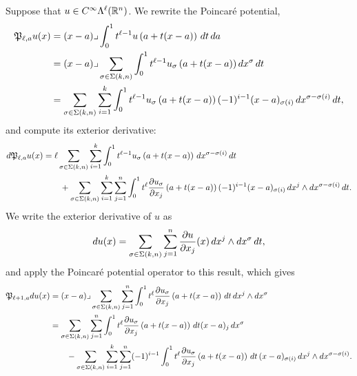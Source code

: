 \documentclass[10pt,letterpaper]{article}
\begin{document}
Suppose that $u \in C^{\infty}\Lambda^{\ell}({\mathbb R}^n)$.
We rewrite the Poincar\'e potential,
\begin{align*}
    {\mathfrak P}_{\ell,a} u(x) 
    &= 
    (x-a)\lrcorner \int_{0}^{1} t^{\ell-1} u\left(a+t(x-a)\right)\,dt\,da\;
    \\&
    = 
    (x-a)\lrcorner 
    \sum_{\sigma \in \Sigma(k,n)}
    \int_{0}^{1} 
    t^{\ell-1} u_{\sigma}\left(a+t(x-a)\right) dx^{\sigma} \,dt 
    \\&
    = 
    \sum_{\sigma \in \Sigma(k,n)} \sum_{i=1}^{k}
    \int_{0}^{1} 
    t^{\ell-1} u_{\sigma}\left(a+t(x-a)\right) (-1)^{i-1} (x-a)_{\sigma(i) } \,dx^{\sigma-\sigma(i)} \,dt 
    ,
\end{align*}
and compute its exterior derivative:
\begin{align*}
    d {\mathfrak P}_{\ell,a} u(x) 
    &= 
    \ell
    \sum_{\sigma \in \Sigma(k,n)} \sum_{i=1}^{k}
    \int_{0}^{1} 
    t^{\ell-1} u_{\sigma}\left(a+t(x-a)\right) \,dx^{\sigma-\sigma(i)} \,dt 
    \\&\qquad
    + 
    \sum_{\sigma \in \Sigma(k,n)} \sum_{i=1}^{k} \sum_{j=1}^{n}
    \int_{0}^{1} 
    t^{\ell} \frac{ \partial u_{\sigma} }{\partial x_{j}}\left(a+t(x-a)\right) (-1)^{i-1} (x-a)_{\sigma(i) } \,dx^{j} \wedge dx^{\sigma-\sigma(i)} \,dt 
    .
\end{align*}
We write the exterior derivative of $u$ as 
\begin{align*}
    d u(x)
    =
    \sum_{\sigma \in \Sigma(k,n)} \sum_{j=1}^{n}
    \frac{ \partial u }{\partial x_{j}}(x) \,dx^{j} \wedge dx^{\sigma} \,dt 
    ,
\end{align*}
and apply the Poincar\'e potential operator to this result, which gives 
\begin{align*}
    {\mathfrak P}_{\ell+1,a} d u(x)
    &=
    (x-a)\lrcorner 
    \sum_{\sigma \in \Sigma(k,n)} \sum_{j=1}^{n}
    \int_{0}^{1} t^{\ell} \frac{ \partial u_{\sigma} }{\partial x_{j}}\left(a+t(x-a)\right) \,dt 
    \,dx^{j} \wedge dx^{\sigma}
    \\&
    = 
    \sum_{\sigma \in \Sigma(k,n)} \sum_{j=1}^{n}
    \int_{0}^{1} t^{\ell} \frac{ \partial u_{\sigma} }{\partial x_{j}}\left(a+t(x-a)\right) \,dt (x-a)_{j}
    \,dx^{\sigma}
    \\&\qquad 
    - 
    \sum_{\sigma \in \Sigma(k,n)} \sum_{i=1}^{k} \sum_{j=1}^{n}
    (-1)^{i-1}
    \int_{0}^{1} t^{\ell} \frac{ \partial u_{\sigma} }{\partial x_{j}}\left(a+t(x-a)\right) \,dt 
    \,(x-a)_{\sigma(i)} 
    \,dx^{j} \wedge dx^{\sigma-\sigma(i)}
    .
\end{align*}
\end{document}
